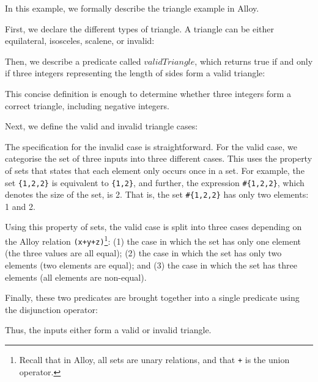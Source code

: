\begin{example}
In this example, we formally describe the triangle example in Alloy.

First, we declare the different types of triangle. A triangle can be either equilateral, isosceles, scalene, or invalid:

\lstset{aboveskip=3mm}

Then, we describe a predicate called $validTriangle$, which returns true if and only if three integers representing the length of sides form a valid triangle:

\lstset{aboveskip=3mm}

This concise definition is enough to determine whether three integers form a correct triangle, including negative integers.

Next, we define the valid and invalid triangle cases:

\lstset{aboveskip=3mm}


The specification for the invalid case is straightforward. For the valid case, we categorise the set of three inputs into three different cases. This uses the property of sets that states that each element only occurs once in a set. For example, the set \texttt{\{1,2,2\}} is equivalent to \texttt{\{1,2\}}, and further, the expression \texttt{\#\{1,2,2\}}, which denotes the size of the set, is 2. That is, the set \texttt{\#\{1,2,2\}} has only two elements: 1 and 2.


Using this property of sets, the valid case is split into three cases depending on the Alloy relation \texttt{(x+y+z)}\footnote{Recall that in Alloy, all sets are unary relations, and that \texttt{+} is the union operator.}: (1) the case in which the set has only one element (the three values are all equal); (2) the case in which the set has only two elements (two elements are equal); and (3) the case in which the set has three elements (all elements are non-equal).

Finally, these two predicates are brought together into a single predicate using the disjunction operator:

\lstset{aboveskip=3mm}

Thus, the inputs either form a valid or invalid triangle.
\end{example}



